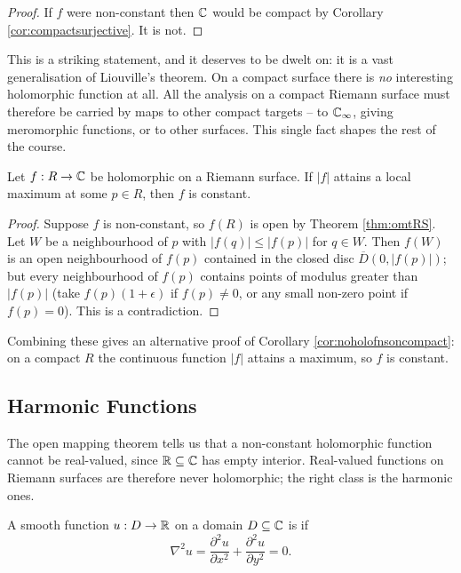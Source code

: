 \documentclass[a4paper]{scrartcl}
\newcommand{\Cinf}{\C_\infty}
\begin{document}
\begin{proof}
	If $f$ were non-constant then $\mathbb{C}$ would be compact by Corollary
	\ref{cor:compactsurjective}. It is not.
\end{proof}

This is a striking statement, and it deserves to be dwelt on: it is a vast generalisation
of Liouville's theorem. On a compact surface there is \emph{no} interesting holomorphic
function at all. All the analysis on a compact Riemann surface must therefore be carried
by maps to other compact targets -- to $\Cinf$, giving meromorphic functions, or to other
surfaces. This single fact shapes the rest of the course.

\begin{theorem}\label{thm:maxmodRS}
	Let $f : R \to \mathbb{C}$ be holomorphic on a Riemann surface. If $|f|$ attains a local
	maximum at some $p \in R$, then $f$ is constant.
\end{theorem}

\begin{proof}
	Suppose $f$ is non-constant, so $f(R)$ is open by Theorem \ref{thm:omtRS}. Let $W$ be a
	neighbourhood of $p$ with $|f(q)| \le |f(p)|$ for $q \in W$. Then $f(W)$ is an open
	neighbourhood of $f(p)$ contained in the closed disc $\overline{D}(0,|f(p)|)$; but every
	neighbourhood of $f(p)$ contains points of modulus greater than $|f(p)|$ (take
	$f(p)(1 + \epsilon)$ if $f(p) \ne 0$, or any small non-zero point if $f(p) = 0$). This
	is a contradiction.
\end{proof}

Combining these gives an alternative proof of Corollary \ref{cor:noholofnsoncompact}: on a
compact $R$ the continuous function $|f|$ attains a maximum, so $f$ is constant.

\subsection{Harmonic Functions}

The open mapping theorem tells us that a non-constant holomorphic function cannot be
real-valued, since $\mathbb{R} \subseteq \mathbb{C}$ has empty interior. Real-valued functions on Riemann
surfaces are therefore never holomorphic; the right class is the harmonic ones.

\begin{definition}
	A smooth function $u : D \to \mathbb{R}$ on a domain $D \subseteq \mathbb{C}$ is  if
	$$
	\nabla^2 u = \frac{\partial^2 u}{\partial x^2} + \frac{\partial^2 u}{\partial y^2} = 0.
	$$
\end{definition}
\end{document}
